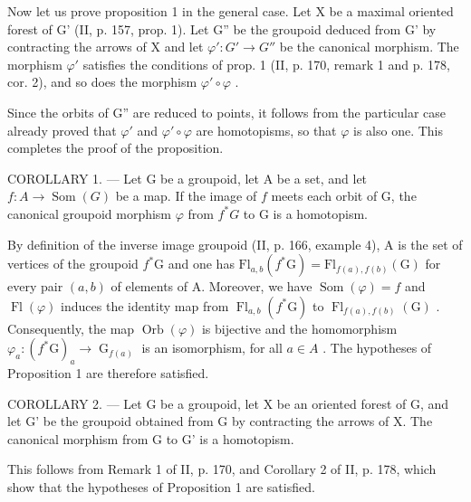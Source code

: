 Now let us prove proposition 1 in the general case. Let X be a maximal oriented forest of G' (II, p. 157, prop. 1). Let G'' be the groupoid deduced from G' by contracting the arrows of X and let \(\varphi'\colon G' \to G''\) be the canonical morphism. The morphism \(\varphi'\) satisfies the conditions of prop. 1 (II, p. 170, remark 1 and p. 178, cor. 2), and so does the morphism \(\varphi'\circ\varphi\) .

Since the orbits of G'' are reduced to points, it follows from the particular case already proved that \(\varphi'\) and \(\varphi'\circ\varphi\) are homotopisms, so that \(\varphi\) is also one. This completes the proof of the proposition.

COROLLARY 1. --- Let G be a groupoid, let A be a set, and let \(f\colon A \to \operatorname{Som}(G)\) be a map. If the image of \(f\) meets each orbit of G, the canonical groupoid morphism \(\varphi\) from \(f^{*}G\) to G is a homotopism.

By definition of the inverse image groupoid (II, p. 166, example 4), A is the set of vertices of the groupoid \(f^{*}\mathrm{G}\) and one has \(\mathrm{Fl}_{a,b}(f^{*}\mathrm{G}) = \mathrm{Fl}_{f(a),f(b)}(\mathrm{G})\) for every pair \((a,b)\) of elements of A. Moreover, we have \(\operatorname{Som}(\varphi) = f\) and \(\operatorname{Fl}(\varphi)\) induces the identity map from \(\operatorname{Fl}_{a,b}(f^{*}\mathrm{G})\) to \(\operatorname{Fl}_{f(a),f(b)}(\mathrm{G})\) . Consequently, the map \(\operatorname{Orb}(\varphi)\) is bijective and the homomorphism \(\varphi_{a}\colon (f^{*}\mathrm{G})_{a} \to \operatorname{G}_{f(a)}\) is an isomorphism, for all \(a \in A\) . The hypotheses of Proposition 1 are therefore satisfied.

COROLLARY 2. --- Let G be a groupoid, let X be an oriented forest of G, and let G' be the groupoid obtained from G by contracting the arrows of X. The canonical morphism from G to G' is a homotopism.

This follows from Remark 1 of II, p. 170, and Corollary 2 of II, p. 178, which show that the hypotheses of Proposition 1 are satisfied.

